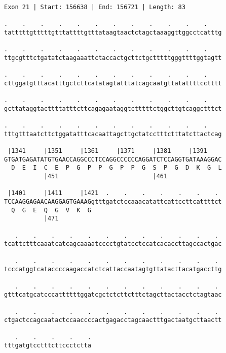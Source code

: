 \documentclass{article}
\begin{document}
\newpage
\begin{Verbatim}
Exon 21 | Start: 156638 | End: 156721 | Length: 83
 
.    .    .    .    .    .    .    .    .    .    .    .    
tatttttgtttttgtttattttgtttataagtaactctagctaaaggttggcctcatttg
  
.    .    .    .    .    .    .    .    .    .    .    .    
ttgcgtttctgatatctaagaaattctaccactgcttctgctttttgggttttggtagtt
  
.    .    .    .    .    .    .    .    .    .    .    .    
cttggatgtttacatttgctcttcatatagtatttatcagcaatgttatattttcctttt
  
.    .    .    .    .    .    .    .    .    .    .    .    
gcttataggtacttttatttcttcagagaataggtctttttctggcttgtcaggctttct
  
.    .    .    .    .    .    .    .    .    .    .    .    
tttgtttaatcttctggatatttcacaattagcttgctatcctttctttatcttactcag
  
 |1341     |1351     |1361     |1371     |1381     |1391    
GTGATGAGATATGTGAACCAGGCCCTCCAGGCCCCCCAGGATCTCCAGGTGATAAAGGAC
  D  E  I  C  E  P  G  P  P  G  P  P  G  S  P  G  D  K  G  L
           |451                          |461               
  
 |1401     |1411     |1421  .    .    .    .    .    .    . 
TCCAAGGAGAACAAGGAGTGAAAGgtttgatctccaaacatattcattccttcattttct
  Q  G  E  Q  G  V  K  G                                    
           |471                                             
  
   .    .    .    .    .    .    .    .    .    .    .    . 
tcattctttcaaatcatcagcaaaatcccctgtatcctccatcacaccttagccactgac
  
   .    .    .    .    .    .    .    .    .    .    .    . 
tcccatggtcataccccaagaccatctcattaccaatagtgttatacttacatgaccttg
  
   .    .    .    .    .    .    .    .    .    .    .    . 
gtttcatgcatcccattttttggatcgctctcttctttctagcttactacctctagtaac
  
   .    .    .    .    .    .    .    .    .    .    .    . 
ctgactccagcaatactccaaccccactgagacctagcaactttgactaatgcttaactt
  
   .    .    .    .    .
tttgatgtcctttcttccctctta
\end{Verbatim}
\newpage
\end{document}
